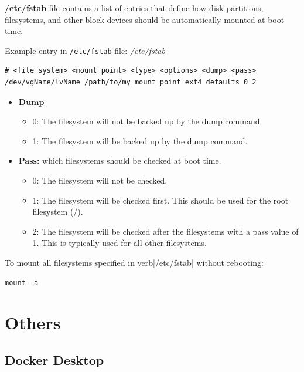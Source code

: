 \documentclass{article}
\newenvironment{codetemplate}[1][]{%
  \mybasecolorbox[#1]
  \itshape
}{%
  \endmybasecolorbox
}
\begin{document}
\textbf{/etc/fstab} file contains a list of entries that define how disk partitions, filesystems, and other block devices should be automatically mounted at boot time.

Example entry in \verb|/etc/fstab| file:
\begin{codetemplate}{/etc/fstab}
\begin{verbatim}
# <file system> <mount point> <type> <options> <dump> <pass>
/dev/vgName/lvName /path/to/my_mount_point ext4 defaults 0 2
\end{verbatim}
\end{codetemplate}

\begin{itemize}
    \item \textbf{Dump}
    \begin{itemize}
        \item 0: The filesystem will not be backed up by the dump command.
        \item 1: The filesystem will be backed up by the dump command.
    \end{itemize}
    \item \textbf{Pass:} which filesystems should be checked at boot time.
    \begin{itemize}
        \item 0: The filesystem will not be checked.
        \item 1: The filesystem will be checked first. This should be used for the root filesystem (/).
        \item 2: The filesystem will be checked after the filesystems with a pass value of 1. This is typically used for all other filesystems.
    \end{itemize}
\end{itemize}

To mount all filesystems specified in verb|/etc/fstab| without rebooting:
\begin{codetemplate}
\begin{verbatim}
mount -a
\end{verbatim}
\end{codetemplate}



\newpage
\section{Others}

\subsection{Docker Desktop}
\end{document}
